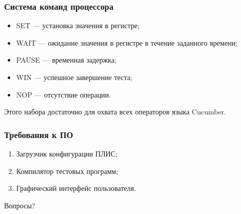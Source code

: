 \documentclass{beamer}
\begin{document}

\begin{frame}
\frametitle{Система команд процессора}
\begin{itemize}
\item SET --- установка значения в регистре;
\item WAIT --- ожидание значения в регистре в течение заданного времени;
\item PAUSE --- временная задержка;
\item WIN --- успешное завершение теста;
\item NOP --- отсутствие операции.
\end{itemize}
Этого набора достаточно для охвата всех операторов языка Cucumber.
\end{frame}



\begin{frame}
\frametitle{Требования к ПО}
\begin{enumerate}
\item Загрузчик конфигурации ПЛИС;
\item Компилятор тестовых программ;
\item Графический интерфейс пользователя.
\end{enumerate}
\end{frame}


\begin{frame}
\Huge{\centerline{Вопросы?}}
\end{frame}

\end{document}

